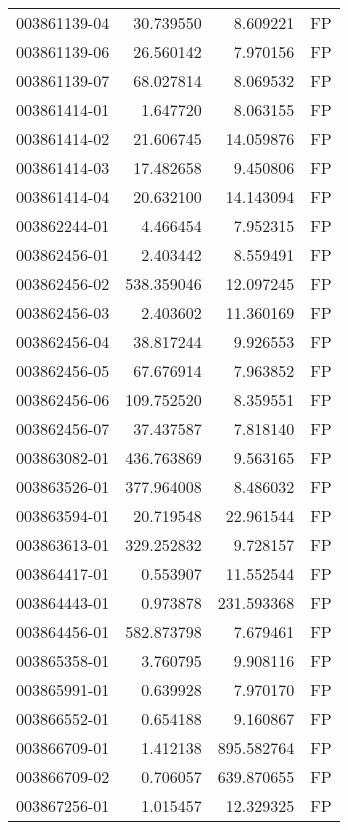 \begin{tabular}{lrrl}
003861139-04 &   30.739550 &       8.609221 &   FP \\
003861139-06 &   26.560142 &       7.970156 &   FP \\
003861139-07 &   68.027814 &       8.069532 &   FP \\
003861414-01 &    1.647720 &       8.063155 &   FP \\
003861414-02 &   21.606745 &      14.059876 &   FP \\
003861414-03 &   17.482658 &       9.450806 &   FP \\
003861414-04 &   20.632100 &      14.143094 &   FP \\
003862244-01 &    4.466454 &       7.952315 &   FP \\
003862456-01 &    2.403442 &       8.559491 &   FP \\
003862456-02 &  538.359046 &      12.097245 &   FP \\
003862456-03 &    2.403602 &      11.360169 &   FP \\
003862456-04 &   38.817244 &       9.926553 &   FP \\
003862456-05 &   67.676914 &       7.963852 &   FP \\
003862456-06 &  109.752520 &       8.359551 &   FP \\
003862456-07 &   37.437587 &       7.818140 &   FP \\
003863082-01 &  436.763869 &       9.563165 &   FP \\
003863526-01 &  377.964008 &       8.486032 &   FP \\
003863594-01 &   20.719548 &      22.961544 &   FP \\
003863613-01 &  329.252832 &       9.728157 &   FP \\
003864417-01 &    0.553907 &      11.552544 &   FP \\
003864443-01 &    0.973878 &     231.593368 &   FP \\
003864456-01 &  582.873798 &       7.679461 &   FP \\
003865358-01 &    3.760795 &       9.908116 &   FP \\
003865991-01 &    0.639928 &       7.970170 &   FP \\
003866552-01 &    0.654188 &       9.160867 &   FP \\
003866709-01 &    1.412138 &     895.582764 &   FP \\
003866709-02 &    0.706057 &     639.870655 &   FP \\
003867256-01 &    1.015457 &      12.329325 &   FP \\

\end{tabular}
